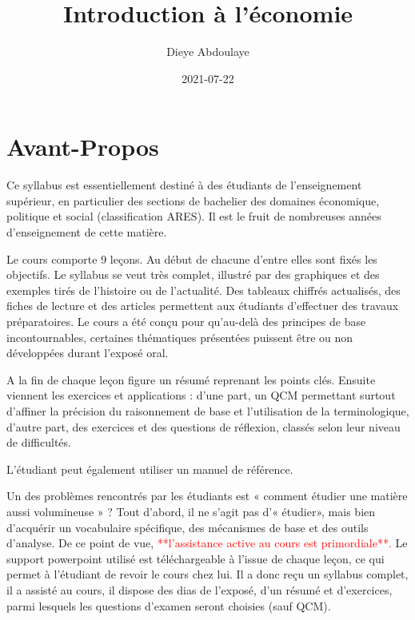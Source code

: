 \documentclass[
]{book}
\title{Introduction à l'économie}
\author{Dieye Abdoulaye}
\date{2021-07-22}
\begin{document}
\maketitle

{
\setcounter{tocdepth}{1}
\tableofcontents
}
\hypertarget{avant-propos}{%
\chapter*{Avant-Propos}\label{avant-propos}}

Ce syllabus est essentiellement destiné à des étudiants de l'enseignement
supérieur, en particulier des sections de bachelier des domaines économique, politique et social (classification ARES). Il est le fruit de nombreuses années d'enseignement de cette matière.

Le cours comporte 9 leçons. Au début de chacune d'entre elles sont fixés les objectifs. Le syllabus se veut très complet, illustré par des graphiques et des exemples tirés de l'histoire ou de l'actualité. Des tableaux chiffrés actualisés, des fiches de lecture et des articles permettent aux étudiants d'effectuer des travaux préparatoires. Le cours a été conçu pour qu'au-delà des principes de base incontournables, certaines thématiques présentées puissent être ou non développées durant l'exposé oral.

A la fin de chaque leçon figure un résumé reprenant les points clés. Ensuite viennent les exercices et applications : d'une part, un QCM permettant surtout d'affiner la précision du raisonnement de base et l'utilisation de la terminologique, d'autre part, des exercices et des questions de réflexion, classés selon leur niveau de difficultés.

L'étudiant peut également utiliser un manuel de référence.

Un des problèmes rencontrés par les étudiants est « comment étudier une
matière aussi volumineuse » ? Tout d'abord, il ne s'agit pas d'« étudier», mais bien d'acquérir un vocabulaire spécifique, des mécanismes de base et des outils d'analyse. De ce point de vue, \textcolor{red}{**l’assistance active au cours est primordiale**.}
Le support powerpoint utilisé est téléchargeable à l'issue de chaque leçon, ce qui permet à l'étudiant de revoir le cours chez lui. Il a donc reçu un syllabus complet, il a assisté au cours, il dispose des dias de l'exposé, d'un résumé et d'exercices, parmi lesquels les questions d'examen seront choisies (sauf QCM).
\end{document}

